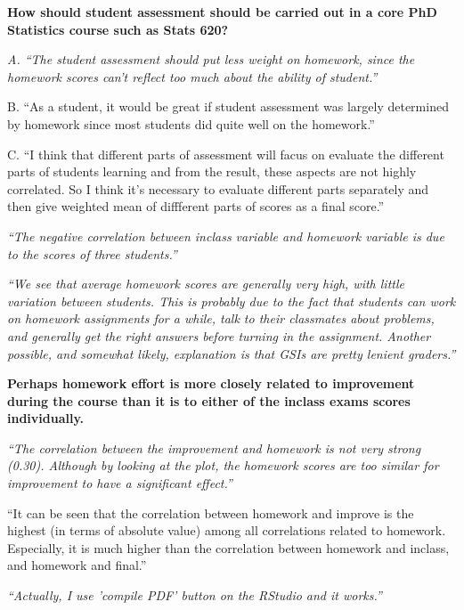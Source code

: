 \documentclass[portrait,11pt]{seminar}
\begin{document}
\bs
{\bf How should student assessment should be carried
out in a core PhD Statistics course such as Stats 620?}

\it 
A. ``The student assessment should put less weight on homework, since the homework scores can't reflect too much about the ability of student.''


B. ``As a student, it would be great if student assessment was largely determined by homework since most students did quite well on the homework.''

C. ``I think that different parts of assessment will facus on evaluate the different parts of students learning and from the result, these aspects are not highly correlated. So I think it’s necessary to evaluate different parts separately and then give weighted mean of diffferent parts of scores as a final score.''

\es

\bs
\it ``The negative correlation between inclass variable and homework variable is due to the scores of three students.''


\es

\bs
\it ``We see that average homework scores are generally very high, with little variation between students. This is probably due to the fact that students can work on homework assignments for a while, talk to their classmates about problems, and generally get the right answers before turning in the assignment. Another possible, and somewhat likely, explanation is that GSIs are pretty lenient graders.''

\es

\bs
{\bf Perhaps homework effort is more closely related to improvement during the course than it is to either of the inclass exams scores individually.}

\it ``The correlation between the improvement and homework is not very strong (0.30). Although by looking at the plot, the homework scores are too similar for improvement to have a significant effect.''


``It can be seen that the correlation between homework and improve is the highest (in terms of absolute value) among all correlations related to homework. Especially, it is much higher than the correlation between homework and inclass, and homework and final.''


\es
\bs
\it ``Actually, I use ’compile PDF’ button on the RStudio and it works.''

\es

\bs
\end{document}
